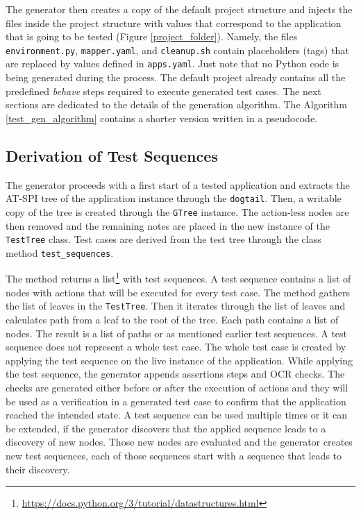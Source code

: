 The generator then creates a copy of the default project structure and injects the files inside the project structure with values that correspond to the application that is going to be tested (Figure \ref{project_folder}). Namely, the files \texttt{environment.py}, \texttt{mapper.yaml}, and \texttt{cleanup.sh} contain placeholders (tags) that are replaced by values defined in \texttt{apps.yaml}. Just note that no Python code is being generated during the process. The default project already contains all the predefined \textit{behave} steps required to execute generated test cases.
The next sections are dedicated to the details of the generation algorithm. The Algorithm \ref{test_gen_algorithm} contains a shorter version written in a pseudocode. 

\subsection{Derivation of Test Sequences}

The generator proceeds with a first start of a tested application and extracts the AT-SPI tree of the application instance through the \texttt{dogtail}. Then, a writable copy of the tree is created through the \texttt{GTree} instance. The action-less nodes are then removed and the remaining notes are placed in the new instance of the \texttt{TestTree} class. Test cases are derived from the test tree through the class method \texttt{test\_sequences}. 

The method returns a list\footnote{\url{https://docs.python.org/3/tutorial/datastructures.html}} with test sequences. A test sequence contains a list of nodes with actions that will be executed for every test case. The method gathers the list of leaves in the \texttt{TestTree}. Then it iterates through the list of leaves and calculates path from a leaf to the root of the tree. Each path contains a list of nodes. The result is a list of paths or as mentioned earlier test sequences. A test sequence does not represent a whole test case. The whole test case is created by applying the test sequence on the live instance of the application. While applying the test sequence, the generator appends assertions steps and OCR checks. The checks are generated either before or after the execution of actions and they will be used as a verification in a generated test case to confirm that the application reached the intended state. A test sequence can be used multiple times or it can be extended, if the generator discovers that the applied sequence leads to a discovery of new nodes. Those new nodes are evaluated and the generator creates new test sequences, each of those sequences start with a sequence that leads to their discovery. 


